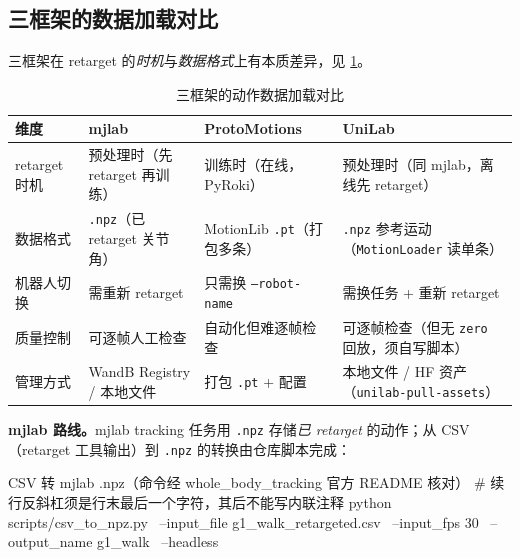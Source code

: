 \subsection{三框架的数据加载对比}
\label{sec:rlmc-imit-data-three}

三框架在 retarget 的\emph{时机}与\emph{数据格式}上有本质差异，见 \cref{tab:rlmc-imit-dataformat}。

\begin{table}[ht]
\centering
\small
\caption{三框架的动作数据加载对比}
\label{tab:rlmc-imit-dataformat}
\begin{tabular}{@{}llll@{}}
\toprule
维度 & mjlab & ProtoMotions & UniLab \\
\midrule
retarget 时机 & 预处理时（先 retarget 再训练） & 训练时（在线，PyRoki） & 预处理时（同 mjlab，离线先 retarget） \\
数据格式 & \texttt{.npz}（已 retarget 关节角） & MotionLib \texttt{.pt}（打包多条） & \texttt{.npz} 参考运动（\texttt{MotionLoader} 读单条） \\
机器人切换 & 需重新 retarget & 只需换 \texttt{--robot-name} & 需换任务 + 重新 retarget \\
质量控制 & 可逐帧人工检查 & 自动化但难逐帧检查 & 可逐帧检查（但无 \texttt{zero} 回放，须自写脚本） \\
管理方式 & WandB Registry / 本地文件 & 打包 \texttt{.pt} + 配置 & 本地文件 / HF 资产（\texttt{unilab-pull-assets}） \\
\bottomrule
\end{tabular}
\end{table}

\textbf{mjlab 路线。}mjlab tracking 任务用 \texttt{.npz} 存储\emph{已 retarget} 的动作；从 CSV（retarget 工具输出）到 \texttt{.npz} 的转换由仓库脚本完成：

\begin{codebox}[bash]{CSV 转 mjlab .npz（命令经 whole\_body\_tracking 官方 README 核对）}
# 续行反斜杠须是行末最后一个字符，其后不能写内联注释
python scripts/csv_to_npz.py \
    --input_file g1_walk_retargeted.csv \
    --input_fps 30 \
    --output_name g1_walk \
    --headless
\end{codebox}

